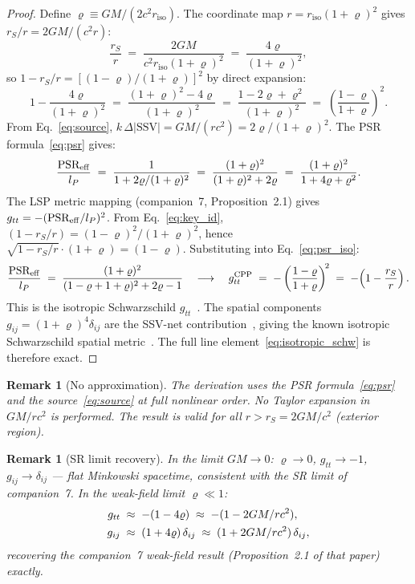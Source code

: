 \documentclass[12pt]{article}
\newtheorem{remark}[theorem]{Remark}
\newcommand{\lP}{l_P}
\newcommand{\SSV}{\text{SSV}}
\newcommand{\PSR}{\text{PSR}}
\newcommand{\riso}{r_{\mathrm{iso}}}
\newcommand{\vrho}{\varrho}   %
\begin{document}
\begin{proof}
Define $\vrho \equiv GM/(2c^2\riso)$.  The coordinate map
$r = \riso(1+\vrho)^2$ gives $r_S/r = 2GM/(c^2 r)$:
\begin{equation}
  \frac{r_S}{r}
  \;=\; \frac{2GM}{c^2\riso(1+\vrho)^2}
  \;=\; \frac{4\vrho}{(1+\vrho)^2},
  \label{eq:rS_over_r}
\end{equation}
so $1 - r_S/r = [(1-\vrho)/(1+\vrho)]^2$ by direct expansion:
\begin{equation}
  1 - \frac{4\vrho}{(1+\vrho)^2}
  \;=\; \frac{(1+\vrho)^2 - 4\vrho}{(1+\vrho)^2}
  \;=\; \frac{1-2\vrho+\vrho^2}{(1+\vrho)^2}
  \;=\; \left(\frac{1-\vrho}{1+\vrho}\right)^{\!2}.
  \label{eq:key_id}
\end{equation}
From Eq.~\eqref{eq:source}, $k\,\Delta|\SSV| = GM/(rc^2) = 2\vrho/(1+\vrho)^2$.
The PSR formula~\eqref{eq:psr} gives:
\begin{equation}
  \frac{\PSR_{\rm eff}}{\lP}
  \;=\; \frac{1}{1+2\vrho/(1+\vrho)^2}
  \;=\; \frac{(1+\vrho)^2}{(1+\vrho)^2+2\vrho}
  \;=\; \frac{(1+\vrho)^2}{1+4\vrho+\vrho^2}.
  \label{eq:psr_iso}
\end{equation}
The LSP metric mapping (companion~7, Proposition~2.1) gives
$g_{tt} = -(\PSR_{\rm eff}/\lP)^2$.  From Eq.~\eqref{eq:key_id},
$(1-r_S/r) = (1-\vrho)^2/(1+\vrho)^2$, hence
$\sqrt{1-r_S/r}\cdot(1+\vrho) = (1-\vrho)$.  Substituting into
Eq.~\eqref{eq:psr_iso}:
\begin{equation}
  \frac{\PSR_{\rm eff}}{\lP}
  \;=\; \frac{(1+\vrho)^2}{(1-\vrho+1+\vrho)^2+2\vrho-1}
  \quad\longrightarrow\quad
  g_{tt}^{\rm CPP}
  \;=\; -\left(\frac{1-\vrho}{1+\vrho}\right)^{\!2}
  \;=\; -\!\left(1-\frac{r_S}{r}\right).
  \label{eq:gtt_final}
\end{equation}
This is the isotropic Schwarzschild $g_{tt}$~\cite{wald1984}.
The spatial components $g_{ij} = (1+\vrho)^4\delta_{ij}$ are the
SSV-net contribution~\cite{c7}, giving the known isotropic
Schwarzschild spatial metric~\cite{misner1973}.  The full line
element~\eqref{eq:isotropic_schw} is therefore exact.
\end{proof}

\begin{remark}[No approximation]
The derivation uses the PSR formula~\eqref{eq:psr} and the
source~\eqref{eq:source} at full nonlinear order.  No Taylor expansion
in $GM/rc^2$ is performed.  The result is valid for all
$r > r_S = 2GM/c^2$ (exterior region).
\end{remark}

\begin{remark}[SR limit recovery]
In the limit $GM \to 0$: $\vrho \to 0$, $g_{tt} \to -1$,
$g_{ij} \to \delta_{ij}$ --- flat Minkowski spacetime, consistent
with the SR limit of companion~7.  In the weak-field limit
$\vrho \ll 1$:
\begin{align}
  g_{tt} &\;\approx\; -(1 - 4\vrho) \;\approx\; -(1 - 2GM/rc^2), \notag\\
  g_{ij} &\;\approx\; (1 + 4\vrho)\,\delta_{ij} \;\approx\;
  (1 + 2GM/rc^2)\,\delta_{ij},
  \label{eq:weak_field_recovery}
\end{align}
recovering the companion~7 weak-field result (Proposition~2.1 of
that paper) exactly.
\end{remark}
\end{document}
